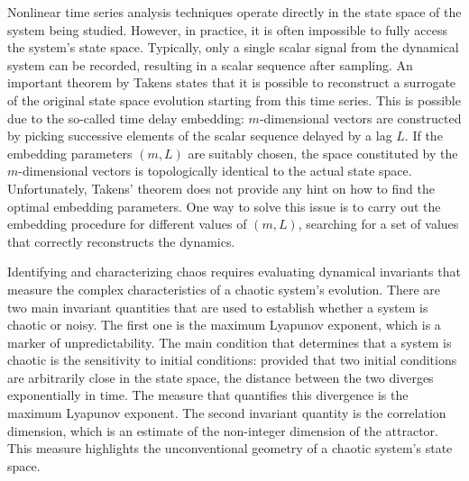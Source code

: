 Nonlinear time series analysis techniques operate directly in the state space of the system being studied. However, in practice, it is often impossible to fully access the system's state space. Typically, only a single scalar signal from the dynamical system can be recorded, resulting in a scalar sequence after sampling.
An important theorem by Takens states that it is possible to reconstruct
a surrogate of the original state space evolution starting from this time series. This is possible
due to the so-called time delay embedding: $m$-dimensional vectors are constructed by picking successive
elements of the scalar sequence delayed by a lag $L$. If the embedding parameters $(m,L)$ are
suitably chosen, the space constituted by the $m$-dimensional vectors is topologically identical
to the actual state space. Unfortunately, Takens' theorem does not provide any hint on how to find
the optimal embedding parameters. One way to solve this issue is to carry out the embedding procedure
for different values of $(m,L)$, searching for a set of values that correctly reconstructs the
dynamics.

Identifying and characterizing chaos requires evaluating dynamical invariants that measure the complex characteristics of a chaotic system's evolution.
There are two main invariant
quantities that are used to establish whether a system is chaotic or noisy.
The first one is the maximum Lyapunov exponent, which is a marker of unpredictability. The main
condition that determines that a system is chaotic is the sensitivity to initial conditions:
provided that two initial conditions are arbitrarily close in the state space, the distance
between the two diverges exponentially in time. The measure that quantifies this divergence is the
maximum Lyapunov exponent. The second invariant quantity is the correlation dimension, which is an
estimate of the non-integer dimension of the attractor. This measure highlights the unconventional
geometry of a chaotic system's state space.

